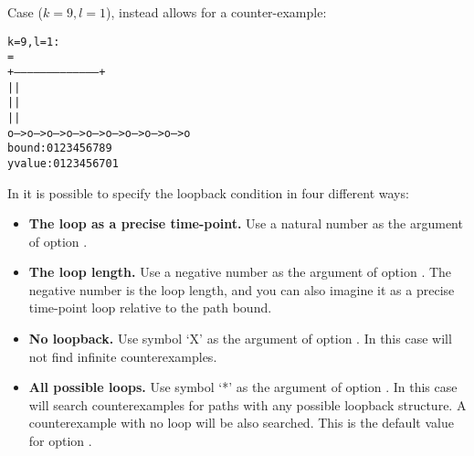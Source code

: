 Case ($k=9, l=1$), instead allows for a counter-example:
\begin{alltt}
k = 9, l = 1:
                                =
              +---------------------------------------+
              |                                       |
              |                                       |
              |                                       |
         o--->o--->o--->o--->o--->o--->o--->o--->o--->o
bound:   0    1    2    3    4    5    6    7    8    9
y value: 0    1    2    3    4    5    6    7    0    1
          
\end{alltt}
In \nusmv it is possible to specify the loopback condition in four
different ways:
\begin{itemize}
\item {\bf The loop as a precise time-point.}
Use a natural number as the argument of option .
\item {\bf The loop length.} 
Use a negative number as the argument of option .
The negative number is the
loop length, and you can also imagine it as a precise time-point loop
relative to the path bound.
\item {\bf No loopback.} 
Use symbol `X' as the argument of option . In this case
\nusmv will not find infinite counterexamples.
\item {\bf All possible loops.} 
Use symbol `*' as the argument of option . In this case
\nusmv will search counterexamples for paths with any possible
loopback structure. A counterexample with no loop will be also
searched. This is the default value for option .
\end{itemize}

